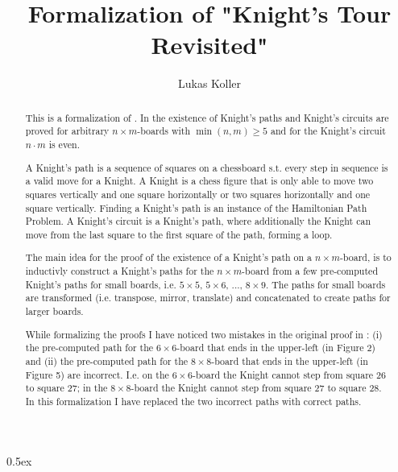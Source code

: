 \documentclass[11pt,a4paper]{article}
\begin{document}
\title{Formalization of "Knight's Tour Revisited"}
\author{Lukas Koller}
\maketitle

\begin{abstract}
This is a formalization of \cite{cull_decurtins_1987}. In \cite{cull_decurtins_1987}
the existence of Knight's paths and Knight's circuits are proved for arbitrary $n\times m$-boards with 
$\operatorname{min}(n,m) \geq 5$ and for the Knight's circuit $n\cdot m$ is even.

A Knight's path is a sequence of squares on a chessboard s.t. every step in sequence is a valid move for 
a Knight. A Knight is a chess figure that is only able to move two squares vertically and one square 
horizontally or two squares horizontally and one square vertically. Finding a Knight's path is an 
instance of the Hamiltonian Path Problem. A Knight's circuit is a Knight's path, where additionally 
the Knight can move from the last square to the first square of the path, forming a loop.

The main idea for the proof of the existence of a Knight's path on a $n\times m$-board, is to inductivly 
construct a Knight's paths for the $n\times m$-board from a few pre-computed Knight's paths for small 
boards, i.e. $5\times 5$, $5\times 6$, ..., $8\times 9$. The paths for small boards are transformed 
(i.e. transpose, mirror, translate) and concatenated to create paths for larger boards.

While formalizing the proofs I have noticed two mistakes in the original proof in \cite{cull_decurtins_1987}: 
(i) the pre-computed path for the $6\times 6$-board that ends in the upper-left (in Figure 2) and (ii) 
the pre-computed path for the $8\times 8$-board that ends in the upper-left (in Figure 5) are incorrect. 
I.e. on the $6\times 6$-board the Knight cannot step from square 26 to square 27; in the $8\times 8$-board 
the Knight cannot step from square 27 to square 28. In this formalization I have replaced the two incorrect 
paths with correct paths.
\end{abstract}

\tableofcontents

\parindent 0pt\parskip 0.5ex





\end{document}
